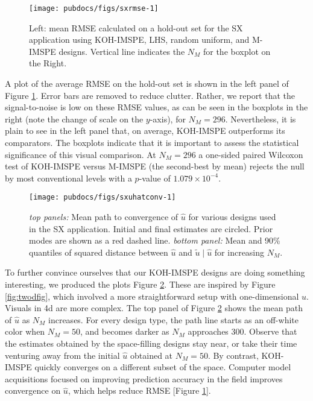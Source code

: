 \documentclass[
]{article}
\begin{document}
\begin{figure}[ht!]
\texttt{[image: pubdocs/figs/sxrmse-1]} \caption{Left: mean RMSE calculated on a hold-out set for the SX application using KOH-IMSPE, LHS, random uniform, and M-IMSPE designs.  Vertical line indicates the $N_M$ for the boxplot on the Right.}\label{fig:sxrmse}
\end{figure}

A plot of the average RMSE on the hold-out set is shown in the left panel of Figure \ref{fig:sxrmse}. Error bars are removed to reduce clutter. Rather, we report that the signal-to-noise is
low on these RMSE values, as can be seen in the boxplots in the right (note the
change of scale on the \(y\)-axis), for \(N_M = 296\). Nevertheless, it is plain to see in the left panel that, on average, KOH-IMSPE outperforms its comparators. The boxplots indicate that it is important to assess the statistical significance
of this visual comparison. At \(N_M = 296\) a one-sided paired Wilcoxon test of KOH-IMSPE versus M-IMSPE (the second-best by mean) rejects
the null by most conventional levels with a \(p\)-value of \ensuremath{1.079\times 10^{-4}}.

\begin{figure}[ht!]
\texttt{[image: pubdocs/figs/sxuhatconv-1]} \caption{\textit{top panels:}  Mean path to convergence of $\hat{u}$ for various designs used in the SX application. Initial and final estimates are circled.  Prior modes are shown as a red dashed line. \textit{bottom panel:}  Mean and 90\% quantiles of squared distance between $\hat{u}$ and $\tilde{u} \mid \hat{u}$ for increasing $N_M$.}\label{fig:sxuhatconv}
\end{figure}

To further convince ourselves that our KOH-IMSPE designs are doing something interesting, we produced the plots Figure \ref{fig:sxuhatconv}. These are inspired by Figure \ref{fig:twodfig}, which involved a more straightforward setup with one-dimensional \(u\). Visuals in 4d are more complex. The top panel of Figure \ref{fig:sxuhatconv} shows the mean path of \(\hat{u}\) as \(N_M\) increases. For every design type, the path line starts as an off-white color when \(N_M = 50\), and becomes darker as \(N_M\) approaches 300. Observe that the estimates obtained by the space-filling designs stay near, or take their time venturing away from the initial \(\hat{u}\) obtained at \(N_M = 50\). By contrast, KOH-IMSPE quickly converges on a different subset of the space. Computer model acquisitions focused on improving prediction accuracy in the field improves convergence on \(\hat{u}\), which helps reduce RMSE {[}Figure \ref{fig:sxrmse}{]}.
\end{document}

